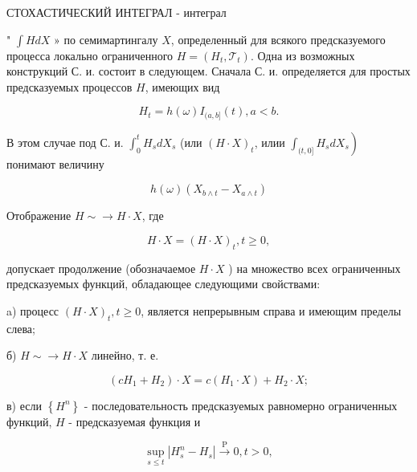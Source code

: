 \documentclass[10pt]{article}
\begin{document}
СТОХАСТИЧЕСКИЙ ИНТЕГРАЛ - интеграл



" $\int H d X$ » по семимартингалу $X$, определенный для всякого предсказуемого процесса локально ограниченного $H=\left(H_{t}, \mathscr{T}_{t}\right)$. Одна из возможных конструкций С. и. состоит в следующем. Сначала С. и. определяется для простых предсказуемых процессов $H$, имеющих вид



\[

H_{t}=h(\omega) I_{(a, b]}(t), a<b .

\]



В этом случае под С. и. $\int_{0}^{t} H_{s} d X_{s}$ (или $(H \cdot X)_{t}$, илии $\left.\int_{(t, 0]} H_{s} d X_{s}\right)$ понимают величину



\[

h(\omega)\left(X_{b \wedge t}-X_{a \wedge t}\right)

\]



Отображение $H \sim \rightarrow H \cdot X$, где



\[

H \cdot X=(H \cdot X)_{t}, t \geqslant 0,

\]



допускает продолжение (обозначаемое $H \cdot X$ ) на множество всех ограниченных предсказуемых функций, обладающее следующими свойствами:



a) процесс $(H \cdot X)_{t}, t \geqslant 0$, является непрерывным справа и имеющим пределы слева;



б) $H \sim \rightarrow H \cdot X$ линейно, т. е.



\[

\left(c H_{1}+H_{2}\right) \cdot X=c\left(H_{1} \cdot X\right)+H_{2} \cdot X ;

\]



в) если $\left\{H^{n}\right\}$ - последовательность предсказуемых равномерно ограниченных функций, $H$ - предсказуемая функция и



\[

\sup _{s \leqslant t}\left|H_{s}^{n}-H_{s}\right| \stackrel{\mathrm{P}}{\longrightarrow} 0, t>0,

\]
\end{document}
